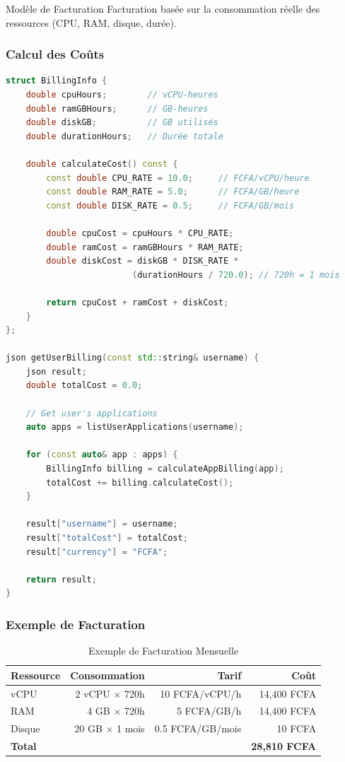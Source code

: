 \documentclass[12pt,a4paper]{article}
\begin{document}
\begin{infobox}{Modèle de Facturation}
Facturation basée sur la consommation réelle des ressources (CPU, RAM, disque, durée).
\end{infobox}

\subsubsection{Calcul des Coûts}

\begin{lstlisting}[language=C++, caption=Calcul de facturation]
struct BillingInfo {
    double cpuHours;        // vCPU-heures
    double ramGBHours;      // GB-heures
    double diskGB;          // GB utilisés
    double durationHours;   // Durée totale
    
    double calculateCost() const {
        const double CPU_RATE = 10.0;     // FCFA/vCPU/heure
        const double RAM_RATE = 5.0;      // FCFA/GB/heure
        const double DISK_RATE = 0.5;     // FCFA/GB/mois
        
        double cpuCost = cpuHours * CPU_RATE;
        double ramCost = ramGBHours * RAM_RATE;
        double diskCost = diskGB * DISK_RATE * 
                         (durationHours / 720.0); // 720h = 1 mois
        
        return cpuCost + ramCost + diskCost;
    }
};

json getUserBilling(const std::string& username) {
    json result;
    double totalCost = 0.0;
    
    // Get user's applications
    auto apps = listUserApplications(username);
    
    for (const auto& app : apps) {
        BillingInfo billing = calculateAppBilling(app);
        totalCost += billing.calculateCost();
    }
    
    result["username"] = username;
    result["totalCost"] = totalCost;
    result["currency"] = "FCFA";
    
    return result;
}
\end{lstlisting}

\subsubsection{Exemple de Facturation}

\begin{table}[H]
\centering
\begin{tabular}{@{}lrrr@{}}
\toprule
\textbf{Ressource} & \textbf{Consommation} & \textbf{Tarif} & \textbf{Coût} \\
\midrule
vCPU & 2 vCPU × 720h & 10 FCFA/vCPU/h & 14,400 FCFA \\
RAM & 4 GB × 720h & 5 FCFA/GB/h & 14,400 FCFA \\
Disque & 20 GB × 1 mois & 0.5 FCFA/GB/mois & 10 FCFA \\
\midrule
\textbf{Total} & & & \textbf{28,810 FCFA} \\
\bottomrule
\end{tabular}
\caption{Exemple de Facturation Mensuelle}
\end{table}
\end{document}
